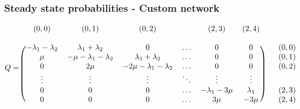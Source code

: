 
\begin{frame}
    \frametitle{Steady state probabilities - Custom network}
    \centering

    \tiny
    \begin{equation*}
        Q = 
        \begin{blockarray}{cccccccc}
            (0, 0) & (0, 1) & (0, 2) & & (2, 3) & (2, 4) & &\\
            & & & & & & & &\\
            \begin{block}{(cccccc)cc}
                -\lambda_1 - \lambda_2 & \lambda_1 + \lambda_2 & 0 & \dots & 0 & 0 & & (0,0) \\
                \mu & -\mu - \lambda_1 - \lambda_2 & \lambda_1 + \lambda_2 & \dots & 0 & 0 & & (0,1) \\
                0 & 2\mu & -2\mu - \lambda_1 - \lambda_2 & \dots & 0 & 0 & & (0,2) \\
                \vdots & \vdots & \vdots & \ddots & \vdots & \vdots \\
                0 & 0 & 0 & \dots & -\lambda_1 - 3\mu & \lambda_1 & & (2,3) \\
                0 & 0 & 0 & \dots & 3\mu & -3\mu & & (2,4) \\
            \end{block}
        \end{blockarray}    
    \end{equation*}
    \normalsize


\end{frame}
